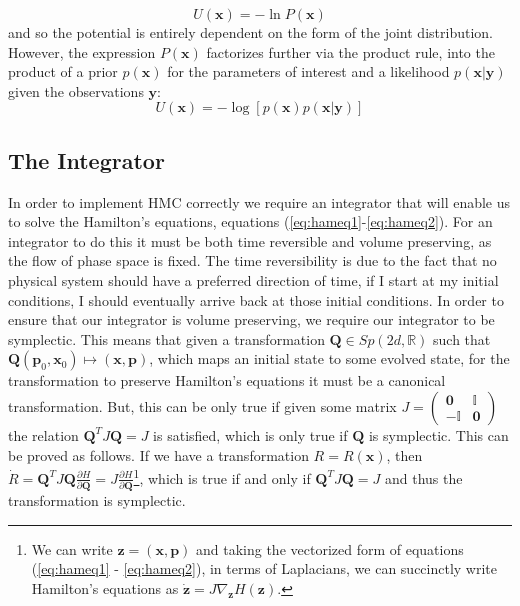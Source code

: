 \documentclass[twoside]{article}
\begin{document}
\begin{equation}
U(\textbf{x}) = -\ln P(\textbf{x})
\end{equation} and so the potential is entirely dependent on the form of the joint distribution. However, the expression $P(\textbf{x})$ factorizes further via the product rule,
into the product of a prior $p(\textbf{x})$ for the parameters of interest and a likelihood $p(\textbf{x}|\textbf{y})$ given the observations $\textbf{y}$: \begin{equation}
U(\textbf{x}) = -\log[p(\textbf{x})p(\textbf{x}|\textbf{y})]
\end{equation}

\subsection{The Integrator}

In order to implement HMC correctly we require an integrator that will enable us to solve the Hamilton's equations, equations (\ref{eq:hameq1}-\ref{eq:hameq2}). For an integrator to do this it must be both time reversible and volume preserving, as the flow of phase space is fixed. The time reversibility is due to the fact that no physical system should have a preferred direction of time, if I start at my initial conditions, I should eventually arrive back at those initial conditions. In order to ensure that our integrator is volume preserving, we require our integrator to be symplectic. This means that given a transformation $\textbf{Q} \in Sp(2d, \mathbb{R})$ such that $\textbf{Q}(\textbf{p}_{0}, \textbf{x}_{0}) \mapsto (\textbf{x}, \textbf{p})$, which maps an initial state to some evolved state, for the transformation to preserve Hamilton's equations it must be a canonical transformation. But, this can be only true if given some matrix $J = \left(\begin{array}{cc} \mathbf{0} & \mathbb{I} \\ -\mathbb{I} & \mathbf{0}\end{array}\right)$ the relation $\textbf{Q}^{T}J\textbf{Q} = J$ is satisfied, which is only true if $\textbf{Q}$ is symplectic. This can be proved as follows. If we have a transformation $R = R(\textbf{x})$, then $\dot{R} = \textbf{Q}^{T}J\textbf{Q}\frac{\partial H}{\partial \textbf{Q}} = J\frac{\partial H}{\partial \textbf{Q}}$\footnote{We can write $\textbf{z} = (\textbf{x}, \textbf{p})$ and taking the vectorized form of equations (\ref{eq:hameq1} - \ref{eq:hameq2}), in terms of Laplacians, we can succinctly write Hamilton's equations as $\dot{\textbf{z}} = J\nabla_{\textbf{z}}H(\textbf{z})$. }, which is true if and only if $\textbf{Q}^{T}J\textbf{Q} = J$ and thus the transformation is symplectic.
\end{document}

